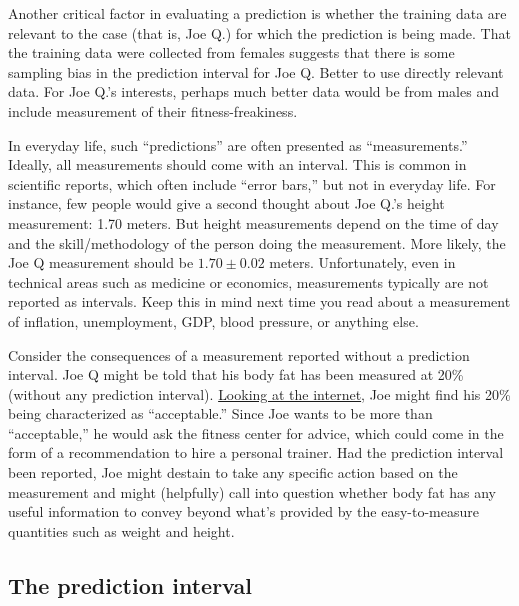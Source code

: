 \documentclass[
  letterpaper,
  DIV=11,
  numbers=noendperiod,
  oneside]{scrartcl}
\begin{document}
\begin{tcolorbox}
Another critical factor in evaluating a prediction is whether the
training data are relevant to the case (that is, Joe Q.) for which the
prediction is being made. That the training data were collected from
females suggests that there is some sampling bias in the prediction
interval for Joe Q. Better to use directly relevant data. For Joe Q.'s
interests, perhaps much better data would be from males and include
measurement of their fitness-freakiness.

In everyday life, such ``predictions'' are often presented as
``measurements.'' Ideally, all measurements should come with an
interval. This is common in scientific reports, which often include
``error bars,'' but not in everyday life. For instance, few people would
give a second thought about Joe Q.'s height measurement: 1.70 meters.
But height measurements depend on the time of day and the
skill/methodology of the person doing the measurement. More likely, the
Joe Q measurement should be \(1.70 \pm 0.02\) meters. Unfortunately,
even in technical areas such as medicine or economics, measurements
typically are not reported as intervals. Keep this in mind next time you
read about a measurement of inflation, unemployment, GDP, blood
pressure, or anything else.

Consider the consequences of a measurement reported without a prediction
interval. Joe Q might be told that his body fat has been measured at
20\% (without any prediction interval).
\href{https://www.nerdfitness.com/blog/body-fat-percentage/}{Looking at
the internet}, {} Joe might find his 20\%
being characterized as ``acceptable.'' Since Joe wants to be more than
``acceptable,'' he would ask the fitness center for advice, which could
come in the form of a recommendation to hire a personal trainer. Had the
prediction interval been reported, Joe might destain to take any
specific action based on the measurement and might (helpfully) call into
question whether body fat has any useful information to convey beyond
what's provided by the easy-to-measure quantities such as weight and
height.

\end{tcolorbox}

\subsection{The prediction interval}\label{the-prediction-interval}
\end{document}
